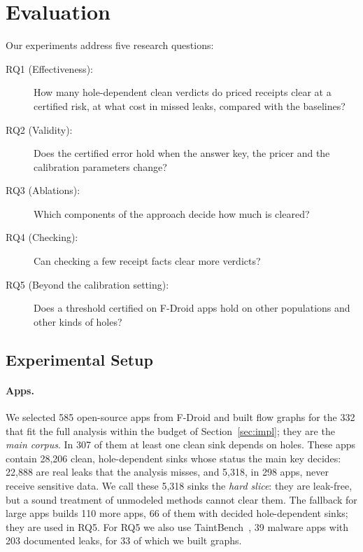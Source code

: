 \section{Evaluation}
\label{sec:eval}

Our experiments address five research questions:
\begin{description}
\item[RQ1 (Effectiveness):] How many hole-dependent clean verdicts do priced receipts clear at a certified risk, at what cost in missed leaks, compared with the baselines?
\item[RQ2 (Validity):] Does the certified error hold when the answer key, the pricer and the calibration parameters change?
\item[RQ3 (Ablations):] Which components of the approach decide how much is cleared?
\item[RQ4 (Checking):] Can checking a few receipt facts clear more verdicts?
\item[RQ5 (Beyond the calibration setting):] Does a threshold certified on F-Droid apps hold on other populations and other kinds of holes?
\end{description}

\subsection{Experimental Setup}
\label{sec:setup}

\paragraph{Apps.}
We selected 585 open-source apps from F-Droid and built flow graphs for the 332 that fit the full analysis within the budget of Section~\ref{sec:impl}; they are the \emph{main corpus}.
In 307 of them at least one clean sink depends on holes.
These apps contain 28{,}206 clean, hole-dependent sinks whose status the main key decides: 22{,}888 are real leaks that the analysis misses, and 5{,}318, in 298 apps, never receive sensitive data.
We call these 5{,}318 sinks the \emph{hard slice}: they are leak-free, but a sound treatment of unmodeled methods cannot clear them.
The fallback for large apps builds 110 more apps, 66 of them with decided hole-dependent sinks; they are used in RQ5.
For RQ5 we also use TaintBench~\cite{taintbench}, 39 malware apps with 203 documented leaks, for 33 of which we built graphs.

